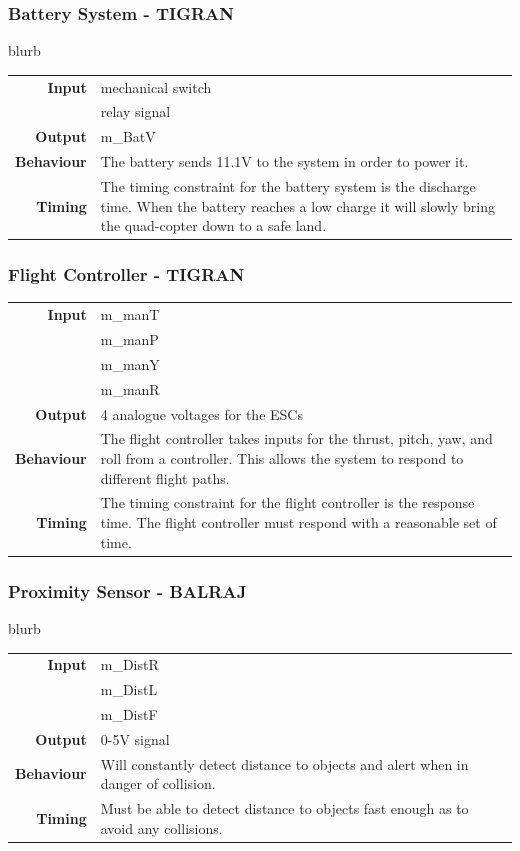 \documentclass[10pt,letterpaper]{article}
\begin{document}
\subsubsection{Battery System - TIGRAN}
blurb
\begin{center}
  \begin{tabular}{r p{8.5cm}}
      \textbf{Input} & mechanical switch\\ & relay signal \\
      \textbf{Output} & m\_BatV \\
      \textbf{Behaviour} & The battery sends 11.1V to the system in order to power it. \\
      \textbf{Timing} & The timing constraint for the battery system is the discharge time. When the battery reaches a low charge it will slowly bring the quad-copter down to a safe land.  \\
  \end{tabular}
\end{center}

\subsubsection{Flight Controller - TIGRAN}
\begin{center}
  \begin{tabular}{r p{8.5cm}}
      \textbf{Input} & m\_manT\\ & m\_manP\\ & m\_manY\\ & m\_manR \\
      \textbf{Output} & 4 analogue voltages for the ESCs \\
      \textbf{Behaviour} & The flight controller takes inputs for the thrust, pitch, yaw, and roll from a controller. This allows the system to respond to different flight paths. \\
      \textbf{Timing} & The timing constraint for the flight controller is the response time. The flight controller must respond with a reasonable set of time.\\
  \end{tabular}
\end{center}

\subsubsection{Proximity Sensor - BALRAJ}
blurb
\begin{center}
  \begin{tabular}{r p{8.5cm}}
      \textbf{Input} & m\_DistR\\ & m\_DistL \\& m\_DistF\\
      \textbf{Output} & 0-5V signal \\
      \textbf{Behaviour} & Will constantly detect distance to objects and alert when in danger of collision. \\
      \textbf{Timing} & Must be able to detect distance to objects fast enough as to avoid any collisions.  \\
  \end{tabular}
\end{center}
\end{document}
